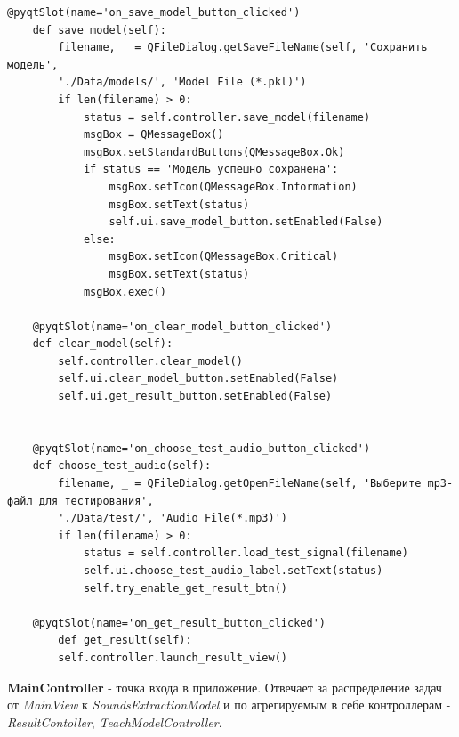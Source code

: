 \documentclass[utf8x, 14pt, oneside, a4paper]{article}
\begin{document}
	\newpage

	\begin{lstlisting}[caption=MainView Продолжение]
	@pyqtSlot(name='on_save_model_button_clicked')
	def save_model(self):
		filename, _ = QFileDialog.getSaveFileName(self, 'Сохранить модель',
		'./Data/models/', 'Model File (*.pkl)')
		if len(filename) > 0:
			status = self.controller.save_model(filename)
			msgBox = QMessageBox()
			msgBox.setStandardButtons(QMessageBox.Ok)
			if status == 'Модель успешно сохранена':
				msgBox.setIcon(QMessageBox.Information)
				msgBox.setText(status)
				self.ui.save_model_button.setEnabled(False)
			else:
				msgBox.setIcon(QMessageBox.Critical)
				msgBox.setText(status)
			msgBox.exec()
	
	@pyqtSlot(name='on_clear_model_button_clicked')
	def clear_model(self):
		self.controller.clear_model()
		self.ui.clear_model_button.setEnabled(False)
		self.ui.get_result_button.setEnabled(False)
	
	
	@pyqtSlot(name='on_choose_test_audio_button_clicked')
	def choose_test_audio(self):
		filename, _ = QFileDialog.getOpenFileName(self, 'Выберите mp3-файл для тестирования',
		'./Data/test/', 'Audio File(*.mp3)')
		if len(filename) > 0:
			status = self.controller.load_test_signal(filename)
			self.ui.choose_test_audio_label.setText(status)
			self.try_enable_get_result_btn()
	
	@pyqtSlot(name='on_get_result_button_clicked')
		def get_result(self):
		self.controller.launch_result_view()
		\end{lstlisting}
		
		{\bf MainController} - точка входа в приложение. Отвечает за распределение задач от \textit{MainView} к \textit{SoundsExtractionModel} и по агрегируемым в себе контроллерам - \textit{ResultContoller}, \textit{TeachModelController}.
		
		\newpage
		
\end{document}
